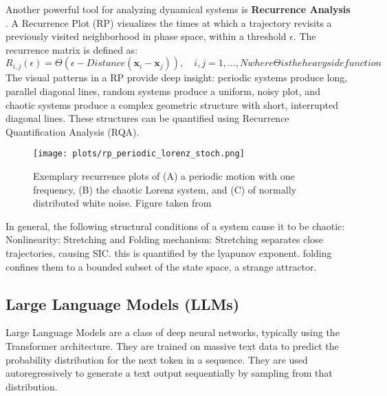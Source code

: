 \documentclass[a4paper,12pt]{article}
\begin{document}
Another powerful tool for analyzing dynamical systems is \textbf{Recurrence Analysis} \cite{MARWAN2007237}. A Recurrence Plot (RP) visualizes the times at which a trajectory revisits a previously visited neighborhood in phase space, within a threshold $\epsilon$. The recurrence matrix is defined as:
\begin{equation}
    R_{i,j}(\epsilon) = \Theta(\epsilon - Distance(\mathbf{x}_i - \mathbf{x}_j)), \quad i,j = 1, \dots, N
    where \Theta is the heavyside function 
\end{equation}
The visual patterns in a RP provide deep insight: periodic systems produce long, parallel diagonal lines, random systems produce a uniform, noisy plot, and chaotic systems produce a complex geometric structure with short, interrupted diagonal lines. These structures can be quantified using Recurrence Quantification Analysis (RQA).

\begin{figure}[H]
    \centering
    \texttt{[image: plots/rp\_periodic\_lorenz\_stoch.png]}
    \caption{Exemplary recurrence plots of (A) a periodic motion with one frequency, (B) the chaotic Lorenz system, and (C) of normally distributed white noise. Figure taken from \cite{DONNER_2011}}
    \label{fig:rp_examples}
\end{figure}


In general, the following structural conditions of a system cause it to be chaotic:
Nonlinearity: %
Stretching and Folding mechanism: Stretching separates close trajectories, causing SIC. this is quantified by the lyapunov exponent. folding confines them to a bounded subset of the state space, a strange attractor.
\cite{Hnon1976ATM}
\cite{ROSSLER1976}
\cite{strogatz_textbook}


\subsection{Large Language Models (LLMs)}
Large Language Models are a class of deep neural networks, typically using the Transformer architecture. They are trained on massive text data to predict the probability distribution for the next token in a sequence. They are used autoregressively to generate a text output sequentially by sampling from that distribution.
\end{document}
